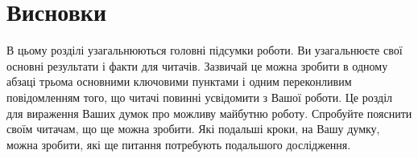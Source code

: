 \documentclass[]{iptconf}
\begin{document}
\section*{Висновки}

В цьому розділі узагальнюються головні підсумки роботи. Ви узагальнюєте свої основні результати і факти для читачів. Зазвичай це можна зробити в одному абзаці трьома основними ключовими пунктами і одним переконливим повідомленням того, що читачі повинні усвідомити з Вашої роботи. Це розділ для вираження Ваших думок про можливу майбутню роботу. Спробуйте пояснити своїм читачам, що ще можна зробити. Які подальші кроки, на Вашу думку, можна зробити, які ще питання потребують подальшого дослідження.
\end{document}
